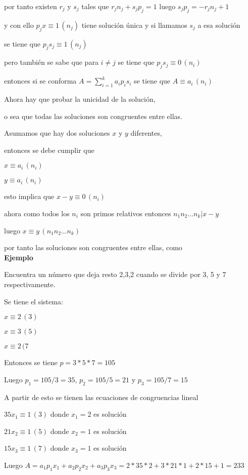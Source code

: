 \documentclass[a4paper,12pt]{report}
\begin{document}
por tanto existen $r_j$ y $s_j$ tales que $r_j n_j + s_j p_j=1$ luego $s_j p_j=-r_j n_j +1$

y con ello $p_jx\equiv 1\, (n_j)$ tiene solución única y si llamamos $s_j$ a esa solución 

se tiene que $p_j s_j\equiv 1\, (n_j)$

pero también se sabe que para $i\neq j$ se tiene que  $p_js_j\equiv 0\, (n_i)$

entonces si se conforma $A=\sum_{i=1}^k a_ip_is_i$ se tiene que $A\equiv a_i \, (n_i)$


Ahora hay que probar la unicidad de la solución, 

o sea que todas las soluciones son congruentes entre ellas. 

Asumamos que hay dos soluciones $x$ y $y$ diferentes,  

entonces se debe cumplir que

$x\equiv a_i\, (n_i)$

$y\equiv a_i\, (n_i)$

esto implica que $x-y\equiv 0\, (n_i)$

ahora como todos los $n_i$ son primos relativos entonces $n_1 n_2\dots n_k | x-y$

luego $x\equiv y\, (n_1 n_2\dots n_k)$ 

por tanto las soluciones son congruentes entre ellas, como\\

\textbf{Ejemplo}

Encuentra un número que deja resto 2,3,2 cuando se divide por 3, 5 y 7 respectivamente.

Se tiene el sistema:

$x\equiv 2 \, (3)$

$x\equiv 3 \, (5)$

$x\equiv 2 \, (7$

Entonces se tiene $p=3*5*7=105$

Luego $p_1=105/3=35$, $p_2=105/5=21$ y $p_3=105/7=15$

A partir de esto se tienen las ecuaciones de congruencias lineal

$35x_1\equiv 1 \, (3)$ donde $x_1=2$ es solución

$21x_2\equiv 1 \, (5)$ donde $x_2=1$ es solución

$15x_3\equiv 1 \, (7)$ donde $x_3=1$ es solución

Luego $A=a_1 p_1 x_1 + a_2 p_2 x_2 + a_3 p_3 x_3 = 2*35*2 + 3*21*1 + 2*15+1 = 233$
\end{document}
